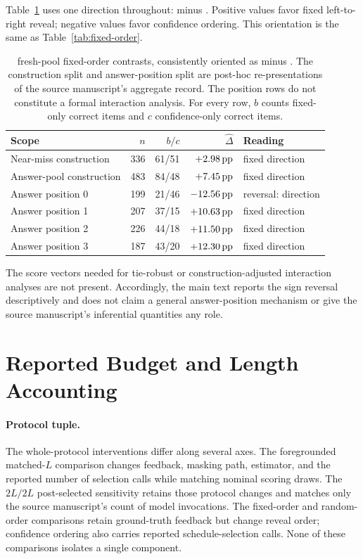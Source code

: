 Table~\ref{tab:fresh-strata-app} uses one direction throughout:
\finj{} minus \sconf{}.  Positive values favor fixed left-to-right reveal; negative
values favor confidence ordering.  This orientation is the same as
Table~\ref{tab:fixed-order}.

\begin{table}[H]
\centering
\small
\setlength{\tabcolsep}{4.8pt}
\caption{\srcv{} fresh-pool fixed-order contrasts, consistently oriented as
\finj{} minus \sconf{}.  The construction split and answer-position split are
post-hoc re-presentations of the source manuscript's aggregate record.  The
position rows do not constitute a formal interaction analysis.  For every
row, $b$ counts fixed-only correct items and $c$ confidence-only correct items.}
\label{tab:fresh-strata-app}
\begin{tabular}{@{}lrrrl@{}}
\toprule
Scope & $n$ & $b/c$ & $\widehat\Delta$ & Reading \\
\midrule
Near-miss construction & 336 & 61/51 & $+2.98\,\mathrm{pp}$ & fixed direction \\
Answer-pool construction & 483 & 84/48 & $+7.45\,\mathrm{pp}$ & fixed direction \\
\midrule
Answer position 0 & 199 & 21/46 & $-12.56\,\mathrm{pp}$ & reversal: \sconf{} direction \\
Answer position 1 & 207 & 37/15 & $+10.63\,\mathrm{pp}$ & fixed direction \\
Answer position 2 & 226 & 44/18 & $+11.50\,\mathrm{pp}$ & fixed direction \\
Answer position 3 & 187 & 43/20 & $+12.30\,\mathrm{pp}$ & fixed direction \\
\bottomrule
\end{tabular}
\end{table}

The score vectors needed for tie-robust or construction-adjusted interaction
analyses are not present.  Accordingly, the main text reports the sign
reversal descriptively and does not claim a general answer-position mechanism
or give the source manuscript's inferential quantities any role.

\section{Reported Budget and Length Accounting}
\label{app:accounting}

\paragraph{Protocol tuple.}
The whole-protocol interventions differ along several axes.  The foregrounded
matched-$L$ comparison changes feedback, masking path, estimator, and the
reported number of selection calls while matching nominal scoring draws.  The $2L/2L$
post-selected sensitivity retains those protocol changes and matches only the
source manuscript's count of model invocations.  The fixed-order and
random-order comparisons retain ground-truth feedback but change reveal order;
confidence ordering also carries reported schedule-selection calls.  None of
these comparisons isolates a single component.

